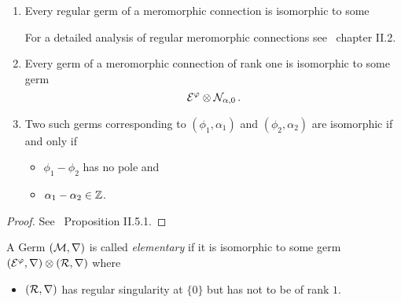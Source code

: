 \begin{prop}
  \begin{enumerate}
    \item Every regular germ of a meromorphic connection is isomorphic to some
      \TODO{}
      \begin{rem}
        For a detailed analysis of regular meromorphic connections
        see~\cite{sabbah2007isomonodromic} chapter II.2.
      \end{rem}
    \item Every germ of a meromorphic connection of rank one is isomorphic to
      some germ
      \[
        \mathcal{E}^\varphi\otimes\mathcal{N}_{\alpha,0} \,.
      \]
    \item Two such germs corresponding to $(\phi_1,\alpha_1)$ and
      $(\phi_2,\alpha_2)$ are isomorphic if and only if
      \begin{itemize}
        \item $\phi_1-\phi_2$ has no pole and
        \item $\alpha_1-\alpha_2\in\mathbb{Z}$.
      \end{itemize}
  \end{enumerate}
\end{prop}
\begin{proof}
  See~\cite{sabbah2007isomonodromic} Proposition II.5.1.
\end{proof}
\begin{defn}
  A Germ $(\mathcal{M},\nabla)$ is called \emph{elementary} if it is isomorphic to
  some germ $(\mathcal{E}^\varphi,\nabla)\otimes(\mathcal{R},\nabla)$ where
  \begin{itemize}
    \item $(\mathcal{R},\nabla)$ has regular singularity at $\{0\}$ but has not to be
      of rank $1$.
  \end{itemize}
\end{defn}
